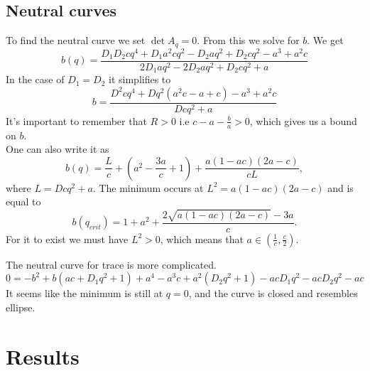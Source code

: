 \documentclass{article}
\begin{document}
\subsection{Neutral curves}
To find the neutral curve we set 
$\det A_q = 0$. From this we solve for $b$. 
We get
\begin{equation}
b(q)=\frac{D_1 D_2 c q^4 + D_1 a^2 c q^2 - D_2 a q^2 + D_2 c q^2 - a^3 + a^2 c}{2 D_1 a q^2 - 2 D_2 a q^2 + D_2 c q^2 + a}
\end{equation}
In the case of $D_1=D_2$ it simplifies to
\begin{equation}
b=\frac{D^2 c q^4 +Dq^2(  a^2 c  -  a  +  c ) - a^3 + a^2 c}{D c q^2 + a} 
\end{equation}
It's important to remember that $R>0$ i.e $c-a-\frac{b}{a}>0$, which gives us a bound on $b$.\\
One can also write it as
\begin{equation}
b(q) = \frac{L}{c}+ (a^2-\frac{3a}{c}+1)+\frac{a(1-ac)(2a-c)}{cL},
\end{equation}
where $L= Dcq^2 + a$. The minimum occurs at $L^2 = a(1-ac)(2a-c)$ and is equal to 
\begin{equation}
b(q_{crit}) = 1+a^2 + \frac{2\sqrt{a(1-ac)(2a-c)}-3a}{c}.
\end{equation}
For it to exist we must have $L^2>0$, which means that $a \in (\frac{1}{c}, \frac{c}{2})$.

The neutral curve  for trace is more complicated. 
\begin{equation}
0=-b^2 + b \left(a c+D_1 q^2+1\right)+a^4-a^3 c+a^2 \left(D_2 q^2+1\right)-a c D_1 q^2-a c D_2 q^2-a c
\end{equation}
It seems like the minimum is still at $q=0$, and the curve is closed and resembles ellipse.

\section{Results}
\end{document}
